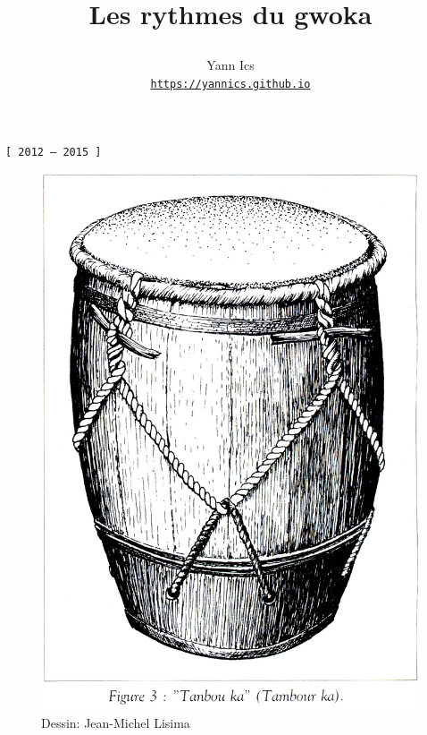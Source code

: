 \documentclass[12pt, fleqn]{extarticle}
\title{%
    \begin{minipage}\linewidth
         \begin{flushleft}
         \bfseries\sffamily
                 \large Les rythmes du gwoka
        \hrulefill
        \end{flushleft}
    \end{minipage}
}
\author{Yann Ics\\ 
{\small %
\href{https://yannics.github.io}{\texttt{https://yannics.github.io}}\\
}
}
\date{
 \begin{minipage}\linewidth
    \begin{center}
    2012 -- 2015
\end{center}
    \end{minipage}
}
\begin{document}
  \maketitle
       
  



 \thispagestyle{empty}

\hrulefill

\vspace*{10pt}

\begin{center}
    \texttt{[ 2012 -- 2015 ]}
\end{center}

\vspace*{25pt}

\begin{figure}[h]
	\begin{center}
\includegraphics[scale=0.6]{img/ka.jpg}
	\end{center}
\caption{Dessin: Jean-Michel Lisima\protect\footnotemark}
\label{ka}
\end{figure}
\end{document}
